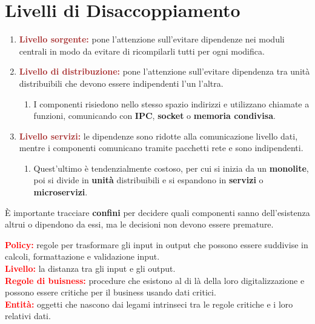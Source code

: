 \section{Livelli di Disaccoppiamento}
\begin{enumerate}
    \item \textbf{\textcolor{brown}{Livello sorgente:}} pone l'attenzione sull'evitare dipendenze nei moduli centrali in modo da evitare di ricompilarli tutti per ogni modifica.
    \item \textbf{\textcolor{brown}{Livello di distribuzione:}} pone l'attenzione sull'evitare dipendenza tra unità distribuibili che devono essere indipendenti l'un l'altra.
    \begin{enumerate}
        \item I componenti risiedono nello stesso spazio indirizzi e utilizzano chiamate a funzioni, comunicando con \textbf{IPC}, \textbf{socket} o \textbf{memoria condivisa}.
    \end{enumerate}
    \item \textbf{\textcolor{brown}{Livello servizi:}} le dipendenze sono ridotte alla comunicazione livello dati, mentre i componenti comunicano tramite pacchetti rete e sono indipendenti.
    \begin{enumerate}
        \item Quest'ultimo è tendenzialmente costoso, per cui si inizia da un \textbf{monolite}, poi si divide in \textbf{unità} distribuibili e si espandono in \textbf{servizi} o \textbf{microservizi}.
    \end{enumerate}
\end{enumerate}

È importante tracciare \textbf{confini} per decidere quali componenti sanno dell'esistenza altrui o dipendono da essi, ma le decisioni non devono essere premature. 

\begin{boxDef}
\textbf{\textcolor{red}{Policy:}} regole per trasformare gli input in output che possono essere suddivise in calcoli, formattazione e validazione input. \\
\textbf{\textcolor{red}{Livello:}} la distanza tra gli input e gli output. \\
\textbf{\textcolor{red}{Regole di buisness:}} procedure che esistono al di là della loro digitalizzazione e possono essere critiche per il business usando dati critici. \\
\textbf{\textcolor{red}{Entità:}} oggetti che nascono dai legami intrinseci tra le regole critiche e i loro relativi dati.
\end{boxDef}

